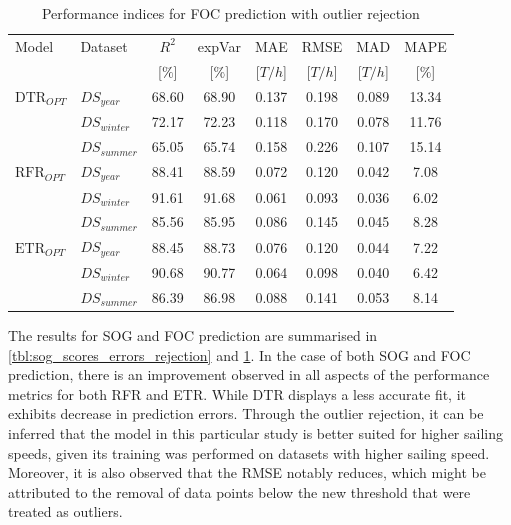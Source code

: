 \begin{table}[h!]
    \small
    \centering
    {\begin{tabular}{ l l c c c c c c }
    \hline
    Model & Dataset & $R^2$ & expVar & MAE & RMSE & MAD & MAPE \\
    & & [$\%$] & [$\%$] & [$T/h$] & [$T/h$] & [$T/h$] & [$\%$]  \\ 
    \hline
    $\text{DTR}_{OPT}$ & $DS_{year}$ & 68.60 & 68.90 & 0.137 & 0.198  & 0.089 & 13.34  \\
    & $DS_{winter}$ & 72.17 & 72.23 & 0.118 & 0.170 & 0.078 & 11.76 \\
    & $DS_{summer}$ & 65.05 & 65.74 & 0.158 &  0.226 & 0.107 & 15.14 \\
    $\text{RFR}_{OPT}$ & $DS_{year}$  & 88.41 & 88.59  & 0.072 & 0.120 & 0.042 & 7.08 \\
    & $DS_{winter}$ & 91.61 & 91.68 & 0.061 & 0.093  & 0.036  & 6.02 \\
    & $DS_{summer}$ & 85.56 & 85.95 & 0.086 & 0.145 & 0.045 & 8.28 \\
    $\text{ETR}_{OPT}$ & $DS_{year}$ & 88.45 & 88.73 & 0.076  & 0.120 & 0.044 & 7.22\\
    & $DS_{winter}$ & 90.68 & 90.77 & 0.064 & 0.098 & 0.040 & 6.42 \\
    & $DS_{summer}$ & 86.39 & 86.98 & 0.088 & 0.141 & 0.053 & 8.14 \\
    \hline
    \end{tabular}}
\caption{Performance indices for FOC prediction with outlier rejection}\label{tbl:FOC_scores_errors_rejection}
\end{table}

The results for SOG and FOC prediction are summarised in \cref{tbl:sog_scores_errors_rejection} and \cref{tbl:FOC_scores_errors_rejection}. In the case of both SOG and FOC prediction, there is an improvement observed in all aspects of the performance metrics for both RFR and ETR. While DTR displays a less accurate fit, it exhibits decrease in prediction errors. Through the outlier rejection, it can be inferred that the model in this particular study is better suited for higher sailing speeds, given its training was performed on datasets with higher sailing speed. Moreover, it is also observed that the RMSE notably reduces, which might be attributed to the removal of data points below the new threshold that were treated as outliers. \\

